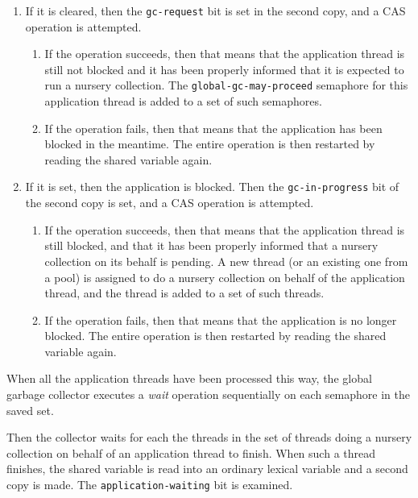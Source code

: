\begin{enumerate}
\item If it is cleared, then the \texttt{gc-request} bit is set in the
  second copy, and a CAS operation is attempted.
  \begin{enumerate}
  \item If the operation succeeds, then that means that the
    application thread is still not blocked and it has been properly
    informed that it is expected to run a nursery collection.  The
    \texttt{global-gc-may-proceed} semaphore for this application
    thread is added to a set of such semaphores.
  \item If the operation fails, then that means that the application
    has been blocked in the meantime.  The entire operation is then
    restarted by reading the shared variable again.
  \end{enumerate}
\item If it is set, then the application is blocked.  Then the
  \texttt{gc-in-progress} bit of the second copy is set, and a CAS
  operation is attempted.
  \begin{enumerate}
  \item If the operation succeeds, then that means that the
    application thread is still blocked, and that it has been properly
    informed that a nursery collection on its behalf is pending.  A
    new thread (or an existing one from a pool) is assigned to do a
    nursery collection on behalf of the application thread, and the
    thread is added to a set of such threads.
    \item If the operation fails, then that means that the application
      is no longer blocked.  The entire operation is then restarted by
      reading the shared variable again.
  \end{enumerate}
\end{enumerate}

When all the application threads have been processed this way, the
global garbage collector executes a \emph{wait} operation sequentially
on each semaphore in the saved set.

Then the collector waits for each the threads in the set of
threads doing a nursery collection on behalf of an application thread
to finish.  When such a thread finishes, the shared variable is read
into an ordinary lexical variable and a second copy is made.  The
\texttt{application-waiting} bit is examined.

